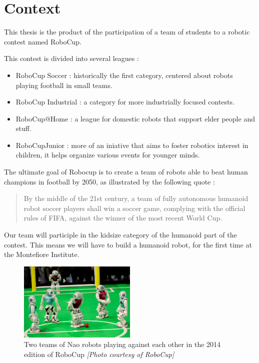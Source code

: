 \section{Context}
This thesis is the product of the participation of a team of students to a robotic contest named RoboCup.

This contest is divided into several leagues :
\begin{itemize}
\item RoboCup Soccer : historically the first category, centered about robots playing football in small teams. 
\item RoboCup Industrial : a category for more industrially focused contests.
\item RoboCup@Home : a league for domestic robots that support elder people and stuff.
\item RoboCupJunior : more of an iniative that aims to foster robotics interest in children, it helps organize various events for younger minds.
\end{itemize}
The ultimate goal of Robocup is to create a team of robots able to beat human champions in football by 2050, as illustrated by the following quote :
\begin{quote}
By the middle of the 21st century, a team of fully autonomous humanoid robot soccer players shall win a soccer game, complying with the official rules of FIFA, against the winner of the most recent World Cup.
\end{quote}

Our team will participle in the kidsize category of the humanoid part of the contest. This means we will have to build a humanoid robot, for the first time at the Montefiore Institute.

\begin{figure}[htp]
\center
\includegraphics[width=0.5\textwidth]{figures/robocup}
\caption[Two teams of Nao robots playing against each other]{Two teams of Nao robots playing against each other in the 2014 edition of RoboCup \textit{[Photo courtesy of RoboCup]}}
\label{fig:intro_robocup}
\end{figure}

